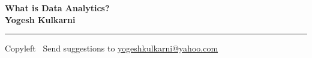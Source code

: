 
\graphicspath{{images/}}

\footnotesize


\begin{center}
\Large{\textbf{What is Data Analytics?\\ Yogesh Kulkarni}}  
\end{center}

\begin{multicols}{2}
% 

\end{multicols}

\rule{\linewidth}{0.25pt}
\scriptsize
Copyleft \textcopyleft\  Send suggestions to 
\href{http://yati.io}{yogeshkulkarni@yahoo.com}


